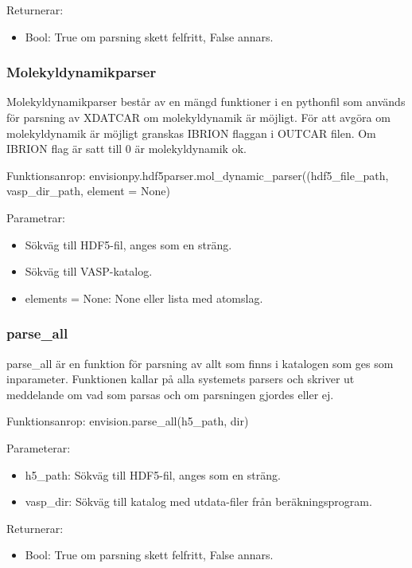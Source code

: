 \documentclass[10pt,oneside,swedish]{article}
\providecommand{\tightlist}{%
  \setlength{\itemsep}{0pt}\setlength{\parskip}{0pt}}
\begin{document}
Returnerar:

\begin{itemize}
\tightlist
\item
  Bool: True om parsning skett felfritt, False annars.
\end{itemize}


\subsubsection{Molekyldynamikparser}\label{Molekyldynamikparser}
Molekyldynamikparser består av en mängd funktioner i en pythonfil som används för parsning av XDATCAR om molekyldynamik är möjligt. För att avgöra om molekyldynamik är möjligt granskas IBRION flaggan i OUTCAR filen. Om IBRION flag är satt till 0 är molekyldynamik ok. 

Funktionsanrop: envisionpy.hdf5parser.mol\_dynamic\_parser((hdf5\_file\_path, vasp\_dir\_path, element = None)

Parametrar:
\begin{itemize}
\tightlist
\item Sökväg till HDF5-fil, anges som en sträng.
\item Sökväg till VASP-katalog.
\item elements = None: None eller lista med atomslag.
\end{itemize}


\subsubsection{parse\_all}\label{parse_all}

parse\_all är en funktion för parsning av allt som finns i katalogen som
ges som inparameter. Funktionen kallar på alla systemets parsers och
skriver ut meddelande om vad som parsas och om parsningen gjordes eller
ej.

Funktionsanrop: envision.parse\_all(h5\_path, dir)


Parameterar:

\begin{itemize}
\tightlist
\item
  h5\_path: Sökväg till HDF5-fil, anges som en sträng.
\item
  vasp\_dir: Sökväg till katalog med utdata-filer från
  beräkningsprogram.
\end{itemize}

Returnerar:

\begin{itemize}
\tightlist
\item
  Bool: True om parsning skett felfritt, False annars.
\end{itemize}
\end{document}
